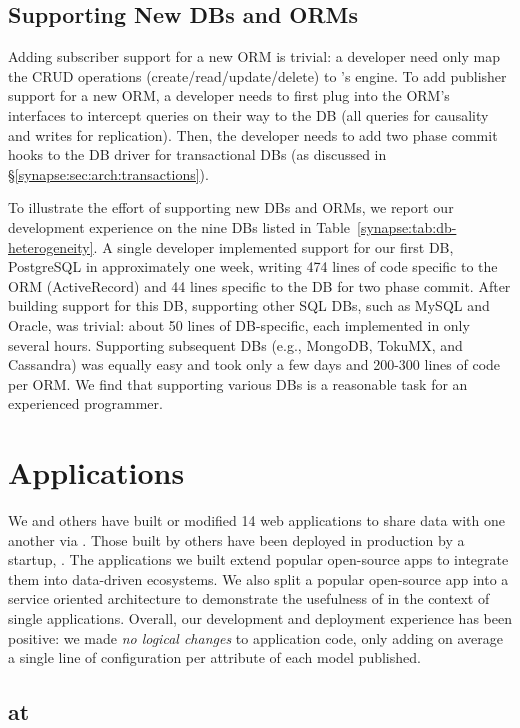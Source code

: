 \subsection{Supporting New DBs and ORMs}
Adding subscriber support for a new ORM is trivial: a developer need only map the CRUD operations (create/read/update/delete) to \synapse's engine.
To add publisher support for a new ORM, a developer needs to first plug into the ORM's interfaces to intercept queries on their way to the DB (all queries for causality and writes for replication).
Then, the developer needs to add two phase commit hooks to the DB driver for transactional DBs (as discussed in \S\ref{synapse:sec:arch:transactions}).

To illustrate the effort of supporting new DBs and ORMs, we report our development experience on the nine DBs listed in Table~\ref{synapse:tab:db-heterogeneity}.
A single developer implemented support for our first DB, PostgreSQL in approximately one week, writing 474 lines of code specific to the ORM (ActiveRecord) and 44 lines specific to the DB for two phase commit.
After building support for this DB, supporting other SQL DBs, such as MySQL and Oracle, was trivial: about 50 lines of DB-specific, each implemented in only several hours.
Supporting subsequent DBs (e.g., MongoDB, TokuMX, and Cassandra) was equally easy and took only a few days and 200-300 lines of code per ORM.
We find that supporting various DBs is a reasonable task for an experienced programmer.

\section{Applications}
\label{synapse:sec:apps}

We and others have built or modified 14 web applications to share data with
one another via \synapse.  Those built by others have been
deployed in production by a startup, \crowdtap.  The applications we built
extend popular open-source apps to integrate them into data-driven ecosystems. 
We also split a popular open-source app into a service oriented architecture
to demonstrate the usefulness of \synapse in the context of single applications.
Overall, our development and deployment experience has been positive: we made
{\em no logical changes} to application code, only adding on
average a single line of configuration per attribute of each model published.


\subsection{\synapse at \crowdtap}
\label{synapse:sec:apps:crowdtap}

